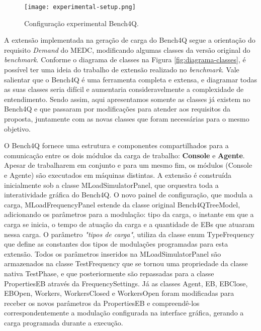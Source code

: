 \begin{figure}[!htb]
	\centering
	\texttt{[image: experimental-setup.png]}	
	\caption{Configuração experimental Bench4Q.}
	\label{fig:experimental-setup}
\end{figure}

A extensão implementada na geração de carga do Bench4Q segue a orientação do requisito \textit{Demand} do MEDC, modificando algumas classes da versão original do \textit{benchmark}. Conforme o diagrama de classes na Figura \ref{fig:diagrama-classes}, é possível ter uma ideia do trabalho de extensão realizado no \textit{benchmark}. Vale  salientar que o Bench4Q é uma ferramenta completa e extensa, e diagramar todas as suas classes seria difícil e aumentaria consideravelmente a complexidade de entendimento. Sendo assim, aqui apresentamos somente as classes já existem no Bench4Q e que passaram por modificações para atender aos requisitos da proposta, juntamente com as novas classes que foram necessárias para o mesmo objetivo.
 
O Bench4Q fornece uma estrutura e componentes compartilhados para a comunicação entre os dois módulos da carga de trabalho: \textbf{Console} e \textbf{Agente}. Apesar de trabalharem em conjunto e para um mesmo fim, os módulos (Console e Agente) são executados em máquinas distintas.  A extensão é construída inicialmente sob a classe \textsf{MLoadSimulatorPanel}, que orquestra toda a interatividade gráfica do Bench4Q. O novo painel de configuração, que modula a carga, \textsf{MLoadFrequencyPanel} estende da classe original \textsf{Bench4QTreeModel}, adicionando os parâmetros para a modulação: tipo da carga, o instante em que a carga se inicia, o tempo de atuação da carga e a quantidade de EBs que atuaram nessa carga. O parâmetro \textit{"tipos de carga"}, utiliza da classe enum \textsf{TypeFrequency} que define as constantes dos tipos de modulações programadas para esta extensão.  Todos os parâmetros inseridos na \textsf{MLoadSimulatorPanel} são armazenados na classe \textsf{TestFrequency} que se tornou uma propriedade da classe nativa \textsf{TestPhase}, e que posteriormente são repassadas para a classe \textsf{PropertiesEB} através da \textsf{FrequencySettings}. Já as classes \textsf{Agent}, \textsf{EB}, \textsf{EBClose}, \textsf{EBOpen}, \textsf{Workers}, \textsf{WorkersClosed} e \textsf{WorkersOpen} foram modificadas para receber os novos parâmetros da \textsf{PropertiesEB} e compreendê-los correspondentemente a modulação configurada na interface gráfica, gerando a carga programada durante a execução.
 
